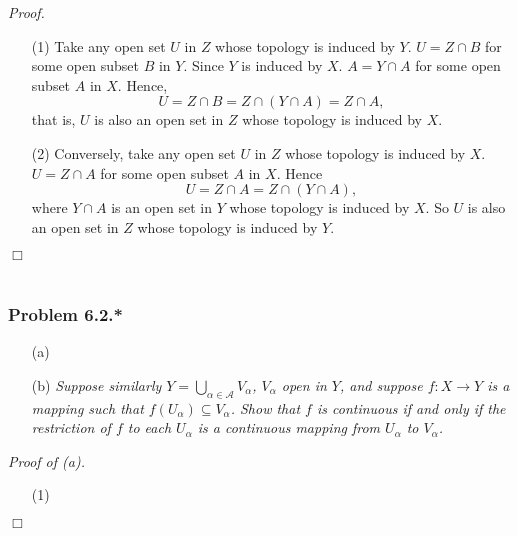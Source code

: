 \documentclass{article}
\begin{document}
\emph{Proof.}
\begin{enumerate}
\item[(1)]
  Take any open set $U$ in $Z$ whose topology is induced by $Y$.
  $U = Z \cap B$ for some open subset $B$ in $Y$.
  Since $Y$ is induced by $X$.
  $A = Y \cap A$ for some open subset $A$ in $X$.
  Hence,
  \[
    U = Z \cap B = Z \cap (Y \cap A) = Z \cap A,
  \]
  that is, $U$ is also an open set in $Z$ whose topology is induced by $X$.

\item[(2)]
  Conversely, take any open set $U$ in $Z$ whose topology is induced by $X$.
  $U = Z \cap A$ for some open subset $A$ in $X$.
  Hence
  \[
    U = Z \cap A = Z \cap (Y \cap A),
  \]
  where $Y \cap A$ is an open set in $Y$ whose topology is induced by $X$.
  So $U$ is also an open set in $Z$ whose topology is induced by $Y$.
\end{enumerate}
$\Box$ \\\\






\subsubsection*{Problem 6.2.*}
\emph{}
\begin{enumerate}
\item[(a)]
  \emph{}

\item[(b)]
  \emph{Suppose similarly $Y = \bigcup_{\alpha \in \mathscr{A}} V_{\alpha}$,
  $V_{\alpha}$ open in $Y$,
  and suppose $f: X \to Y$ is a mapping such that $f(U_{\alpha}) \subseteq V_{\alpha}$.
  Show that $f$ is continuous if and only if
  the restriction of $f$ to each $U_{\alpha}$ is a continuous mapping
  from $U_{\alpha}$ to $V_{\alpha}$.} \\
\end{enumerate}



\emph{Proof of (a).}
\begin{enumerate}
\item[(1)]
\end{enumerate}
$\Box$ \\
\end{document}
